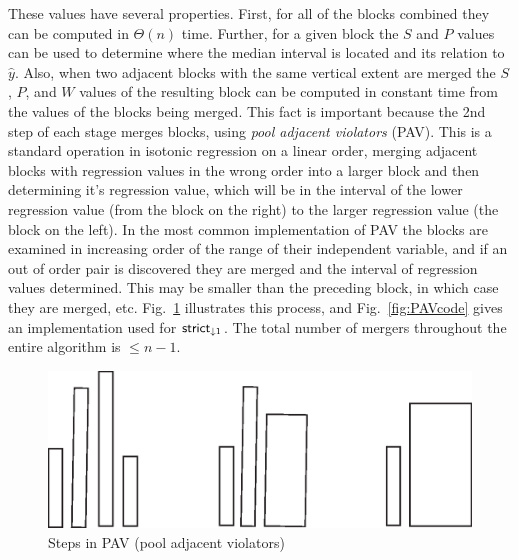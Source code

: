 \documentclass[11pt]{article}
\newcommand{\Strictdown}[2]{\ensuremath{\mathsf{strict}_{\downarrow{#1}}\ifthenelse{\equal{#2}{}}{}{(#2)}}}
\begin{document}
These values have several properties.
First, for all of the blocks combined they can be computed in $\Theta(n)$ time.
Further, for a given block the $S$ and $P$ values can be used to determine where the median interval is located and its relation to $\hat{y}$.
Also, when two adjacent blocks with the same vertical extent are merged the $S$, $P$, and $W$ values of the resulting block can be computed in constant time from the values of the blocks being merged.
This fact is important because the 2nd step of each stage merges blocks, using \textit{pool adjacent violators} (PAV). 
This is a standard operation in isotonic regression on a linear order, merging adjacent blocks with regression values in the wrong order into a larger block and then determining it's regression value, which will be in the interval of the lower regression value (from the block on the right) to the larger regression value (the block on the left).
In the most common implementation of PAV the blocks are examined in increasing order of the range of their independent variable, and if an out of order pair is discovered they are merged and the interval of regression values determined.
This may be smaller than the preceding block, in which case they are merged, etc.
Fig.~\ref{fig:PAVfigure} illustrates this process, and Fig.~\ref{fig:PAVcode} gives an implementation used for \Strictdown{1}{}.
The total number of mergers throughout the entire algorithm is $ \leq n-1$.

\begin{figure}
\centering
\includegraphics[scale=0.7]{PAV.eps}
\caption{Steps in PAV (pool adjacent violators)}    \label{fig:PAVfigure}

\hrulefill
\end{figure}
\end{document}
